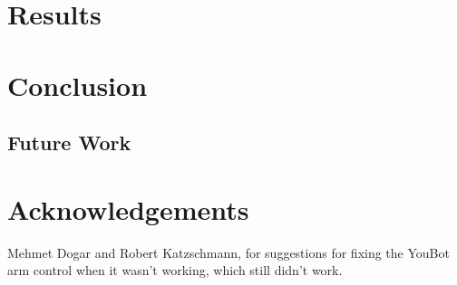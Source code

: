\documentclass[conference]{acmsiggraph}
\begin{document}
\section{Results}

\section{Conclusion}

\subsection{Future Work}



\section*{Acknowledgements}

Mehmet Dogar and Robert Katzschmann, for suggestions for fixing the YouBot arm control when it wasn't working, which still didn't work.





\end{document}
